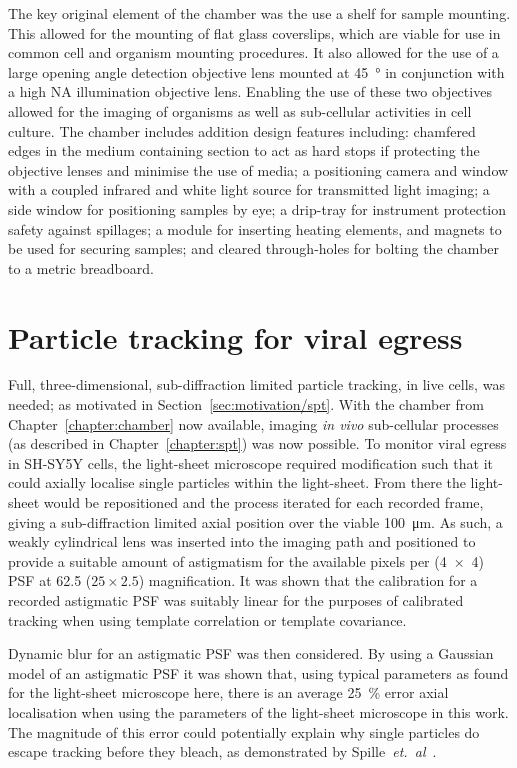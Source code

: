 The key original element of the chamber was the use a shelf for sample mounting.
This allowed for the mounting of flat glass coverslips, which are viable for use in common cell and organism mounting procedures.
It also allowed for the use of a large opening angle detection objective lens mounted at \SI{45}{\degree} in conjunction with a high NA illumination objective lens.
Enabling the use of these two objectives allowed for the imaging of organisms as well as sub-cellular activities in cell culture.
The chamber includes addition design features including: chamfered edges in the medium containing section to act as hard stops if protecting the objective lenses and minimise the use of media; a positioning camera and window with a coupled infrared and white light source for transmitted light imaging; a side window for positioning samples by eye; a drip-tray for instrument protection safety against spillages; a module for inserting heating elements, and magnets to be used for securing samples; and cleared through-holes for bolting the chamber to a metric breadboard.

\section{Particle tracking for viral egress} %
Full, three-dimensional, sub-diffraction limited particle tracking, in live cells, was needed; as motivated in Section~\ref{sec:motivation/spt}.
With the chamber from Chapter~\ref{chapter:chamber} now available, imaging \emph{in vivo} sub-cellular processes (as described in Chapter~\ref{chapter:spt})
was now possible.
To monitor viral egress in \gls{SH-SY5Y} cells, the light-sheet microscope required modification such that it could axially localise single particles within the light-sheet.
From there the light-sheet would be repositioned and the process iterated for each recorded frame, giving a sub-diffraction limited axial position over the viable \SI{100}{\micro\meter}.
As such, a weakly cylindrical lens was inserted into the imaging path and positioned to provide a suitable amount of astigmatism for the available pixels per (\SI{4x4}{}) \gls{PSF} at \SI{62.5}{\times} (\(25\times2.5\)) magnification.
It was shown that the calibration for a recorded astigmatic \gls{PSF} was suitably linear for the purposes of calibrated tracking when using template correlation or template covariance.

Dynamic blur for an astigmatic \gls{PSF} was then considered.
By using a Gaussian model of an astigmatic \gls{PSF} it was shown that, using typical parameters as found for the light-sheet microscope here, there is an average \SI{25}{\percent} error axial localisation when using the parameters of the light-sheet microscope in this work.
The magnitude of this error could potentially explain why single particles do escape tracking before they bleach, as demonstrated by Spille~\emph{et.~al}~\cite{spilleDirectObservationMobility2015}.

